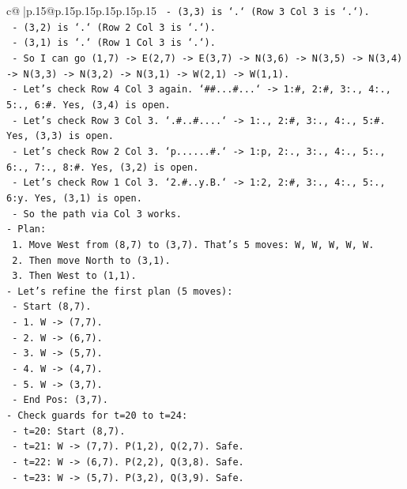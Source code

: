 \documentclass{article}
\begin{document}
{\begin{supertabular}{c@{$\;$}|p{.15\linewidth}@{}p{.15\linewidth}p{.15\linewidth}p{.15\linewidth}p{.15\linewidth}p{.15\linewidth}}
{{{\texttt{  {-} (3,3) is `.` (Row 3 Col 3 is `.`).} \\
\texttt{  {-} (3,2) is `.` (Row 2 Col 3 is `.`).} \\
\texttt{  {-} (3,1) is `.` (Row 1 Col 3 is `.`).} \\
\texttt{  {-} So I can go (1,7) {-}> E(2,7) {-}> E(3,7) {-}> N(3,6) {-}> N(3,5) {-}> N(3,4) {-}> N(3,3) {-}> N(3,2) {-}> N(3,1) {-}> W(2,1) {-}> W(1,1).} \\
\texttt{  {-} Let's check Row 4 Col 3 again. `\#\#...\#...` {-}> 1:\#, 2:\#, 3:., 4:., 5:., 6:\#. Yes, (3,4) is open.} \\
\texttt{  {-} Let's check Row 3 Col 3. `.\#..\#....` {-}> 1:., 2:\#, 3:., 4:., 5:\#. Yes, (3,3) is open.} \\
\texttt{  {-} Let's check Row 2 Col 3. `p......\#.` {-}> 1:p, 2:., 3:., 4:., 5:., 6:., 7:., 8:\#. Yes, (3,2) is open.} \\
\texttt{  {-} Let's check Row 1 Col 3. `2.\#..y.B.` {-}> 1:2, 2:\#, 3:., 4:., 5:., 6:y. Yes, (3,1) is open.} \\
\texttt{  {-} So the path via Col 3 works.} \\
\texttt{{-} Plan:} \\
\texttt{  1. Move West from (8,7) to (3,7). That's 5 moves: W, W, W, W, W.} \\
\texttt{  2. Then move North to (3,1).} \\
\texttt{  3. Then West to (1,1).} \\
\texttt{{-} Let's refine the first plan (5 moves):} \\
\texttt{  {-} Start (8,7).} \\
\texttt{  {-} 1. W {-}> (7,7).} \\
\texttt{  {-} 2. W {-}> (6,7).} \\
\texttt{  {-} 3. W {-}> (5,7).} \\
\texttt{  {-} 4. W {-}> (4,7).} \\
\texttt{  {-} 5. W {-}> (3,7).} \\
\texttt{  {-} End Pos: (3,7).} \\
\texttt{{-} Check guards for t=20 to t=24:} \\
\texttt{  {-} t=20: Start (8,7).} \\
\texttt{  {-} t=21: W {-}> (7,7). P(1,2), Q(2,7). Safe.} \\
\texttt{  {-} t=22: W {-}> (6,7). P(2,2), Q(3,8). Safe.} \\
\texttt{  {-} t=23: W {-}> (5,7). P(3,2), Q(3,9). Safe.} \\
}}}
\end{supertabular}}
\end{document}
